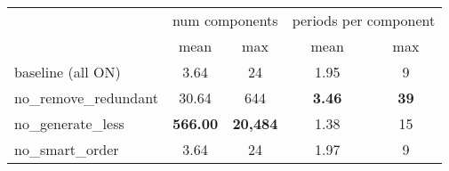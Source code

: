 \begin{table}[H]
	\centering
	\begin{tabular}{l c c c c}
		\toprule
		& \multicolumn{2}{c}{num components} & \multicolumn{2}{c}{periods per component} \\
		\cmidrule(lr){2-3} \cmidrule(lr){4-5}
		& mean & max & mean & max \\
		\midrule
	baseline (all ON) & 3.64 & 24 & 1.95 & 9 \\
	no\_remove\_redundant & 30.64 & 644 & \textbf{3.46} & \textbf{39} \\
	no\_generate\_less & \textbf{566.00} & \textbf{20{,}484} & 1.38 & 15 \\
	no\_smart\_order & 3.64 & 24 & 1.97 & 9 \\
  \bottomrule
	\end{tabular}
\end{table}
